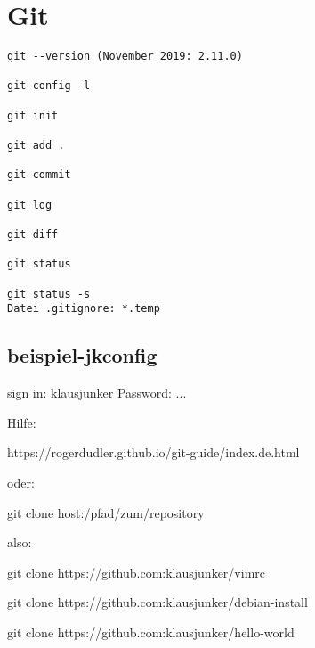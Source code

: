 \section{Git}

\begin{verbatim}
git --version (November 2019: 2.11.0)

git config -l

git init

git add .

git commit  

git log

git diff

git status

git status -s
Datei .gitignore: *.temp  
\end{verbatim}
\subsection{beispiel-jkconfig}
sign in:
klausjunker
Password: ... 

Hilfe:

https://rogerdudler.github.io/git-guide/index.de.html

oder:

git clone host:/pfad/zum/repository

also:

git clone https://github.com:klausjunker/vimrc

git clone https://github.com:klausjunker/debian-install

git clone https://github.com:klausjunker/hello-world
